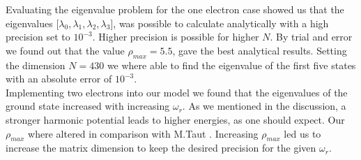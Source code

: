 \documentclass[twoside,onecolumn]{article}
\begin{document}
Evaluating the eigenvalue problem for the one electron case showed us that the eigenvalues [$\lambda_0, \lambda_1, \lambda_2, \lambda_3$], was possible to calculate analytically with a high precision set to $10^{-3}$. Higher precision is possible for higher $N$. By trial and error we found out that the value $\rho_{max} = 5.5$, gave the best analytical results. Setting the dimension $N = 430$ we where able to find the eigenvalue of the first five states with an absolute error of $10^{-3}$.\\

Implementing two electrons into our model we found that the eigenvalues of the ground state increased with increasing $\omega_{r}$. As we mentioned in the discussion, a stronger harmonic potential leads to higher energies, as one should expect. Our $\rho_{max}$ where altered in comparison with M.Taut \cite{taut}. Increasing $\rho_{max}$ led us to increase the matrix dimension to keep the desired precision for the given $\omega_r$. 






\end{document}
